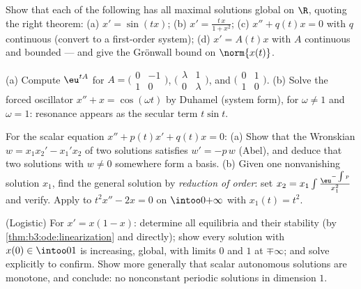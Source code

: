\begin{exercise}[$\star\star$]\label{exo:b3:ode:3}
Show that each of the following has all maximal solutions
global on $\R$, quoting the right theorem:
(a) $x' = \sin(tx)$;
(b) $x' = \frac{t\,x}{1 + x^2}$;
(c) $x'' + q(t)x = 0$ with $q$ continuous (convert to a
first-order system);
(d) $x' = A(t)x$ with $A$ continuous and bounded --- and give
the Gr\"onwall bound on $\norm{x(t)}$.
\end{exercise}

\begin{exercise}[$\star\star$]\label{exo:b3:ode:4}
(a) Compute $\eu^{tA}$ for
$A = \bigl(\begin{smallmatrix}0 & -1\\ 1 &
0\end{smallmatrix}\bigr)$,
$\bigl(\begin{smallmatrix}\lambda & 1\\ 0 &
\lambda\end{smallmatrix}\bigr)$, and
$\bigl(\begin{smallmatrix}0 & 1\\ 1 &
0\end{smallmatrix}\bigr)$.
(b) Solve the forced oscillator $x'' + x = \cos(\omega t)$
by Duhamel (system form), for $\omega \neq 1$ and $\omega =
1$: resonance appears as the secular term $t\sin t$.
\end{exercise}

\begin{exercise}[$\star\star$]\label{exo:b3:ode:5}
For the scalar equation $x'' + p(t)x' + q(t)x = 0$:
(a) Show that the Wronskian $w = x_1x_2' - x_1'x_2$ of two
solutions satisfies $w' = -p\,w$ (Abel), and deduce that two
solutions with $w \neq 0$ somewhere form a basis.
(b) Given one nonvanishing solution $x_1$, find the general
solution by \emph{reduction of order}: set $x_2 = x_1\int
\frac{\eu^{-\int p}}{x_1^2}$ and verify. Apply to $t^2x'' -
2x = 0$ on $\intoo0{+\infty}$ with $x_1(t) = t^2$.
\end{exercise}

\begin{exercise}[$\star\star$]\label{exo:b3:ode:6}
(Logistic) For $x' = x(1 - x)$: determine all equilibria and
their stability (by \cref{thm:b3:ode:linearization} and
directly); show every solution with $x(0) \in \intoo01$ is
increasing, global, with limits $0$ and $1$ at $\mp\infty$;
and solve explicitly to confirm. Show more generally that
scalar autonomous solutions are monotone, and conclude:
no nonconstant periodic solutions in dimension $1$.
\end{exercise}

